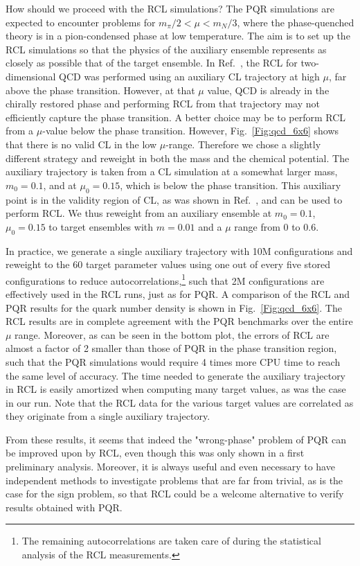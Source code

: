 \documentclass[prd,showpacs,reprint,nofootinbib,showkeys]{revtex4-1}
\begin{document}
How should we proceed with the RCL simulations? The PQR simulations are expected to encounter problems for $m_\pi/2<\mu<m_N/3$, where the phase-quenched theory is in a pion-condensed phase at low temperature. The aim is to set up the RCL simulations so that the physics of the auxiliary ensemble represents as closely as possible that of the target ensemble. In Ref.\ \cite{Bloch:2017sfg}, the RCL for two-dimensional QCD was performed using an auxiliary CL trajectory at high $\mu$, far above the phase transition. However, at that $\mu$ value, QCD is already in the chirally restored phase and performing RCL from that trajectory may not efficiently capture the phase transition. A better choice may be to perform RCL from a $\mu$-value below the phase transition. However, Fig.\ \ref{Fig:qcd_6x6} shows that there is no valid CL in the low $\mu$-range. Therefore we chose a slightly different strategy and reweight in both the mass and the chemical potential. The auxiliary trajectory is taken from a CL simulation at a somewhat larger mass, $m_0=0.1$, and at $\mu_0=0.15$, which is below the phase transition. This auxiliary point is in the validity region of CL, as was shown in Ref.\ \cite{Bloch:2017sfg}, and can be used to perform RCL. We thus reweight from an auxiliary ensemble at $m_0=0.1$, $\mu_0=0.15$ to target ensembles with $m=0.01$ and a $\mu$ range from 0 to 0.6. 

In practice, we generate a single auxiliary trajectory with 10M configurations and reweight to the 60 target parameter values using one out of every five stored configurations to reduce autocorrelations,\footnote{The remaining autocorrelations are taken care of during the statistical analysis of the RCL measurements.} such that 2M configurations are effectively used in the RCL runs, just as for PQR.  A comparison of the RCL and PQR results for the quark number density is shown in Fig.\ \ref{Fig:qcd_6x6}. The RCL results are in complete agreement with the PQR benchmarks over the entire $\mu$ range. Moreover, as can be seen in the bottom plot, the errors of RCL are almost a factor of 2 smaller than those of PQR in the phase transition region, such that the PQR simulations would require 4 times more CPU time to reach the same level of accuracy.
The time needed to generate the auxiliary trajectory in RCL is easily amortized when computing many target values, as was the case in our run. Note that the RCL data for the various target values are correlated as they originate from a single auxiliary trajectory.

From these results, it seems that indeed the "wrong-phase" problem of PQR can be improved upon by RCL, even though this was only shown in a first preliminary analysis. 
Moreover, it is always useful and even necessary to have independent methods to investigate problems that are far from trivial, as is the case for the sign problem, so that RCL could be a welcome alternative to verify results obtained with PQR.
\end{document}

